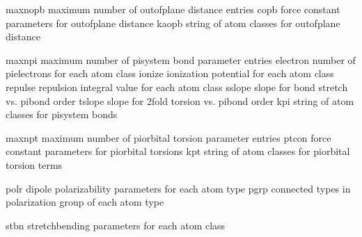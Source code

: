 \documentclass[letterpaper,11pt,english]{sphinxmanual}
\begin{document}
\begin{sphinxVerbatim}[commandchars=\\\{\}]
maxnopb         maximum number of out\PYGZhy{}of\PYGZhy{}plane distance entries
copb            force constant parameters for out\PYGZhy{}of\PYGZhy{}plane distance
kaopb           string of atom classes for out\PYGZhy{}of\PYGZhy{}plane distance
\end{sphinxVerbatim}


\begin{sphinxVerbatim}[commandchars=\\\{\}]
maxnpi          maximum number of pisystem bond parameter entries
electron        number of pi\PYGZhy{}electrons for each atom class
ionize          ionization potential for each atom class
repulse         repulsion integral value for each atom class
sslope          slope for bond stretch vs. pi\PYGZhy{}bond order
tslope          slope for 2\PYGZhy{}fold torsion vs. pi\PYGZhy{}bond order
kpi             string of atom classes for pisystem bonds
\end{sphinxVerbatim}


\begin{sphinxVerbatim}[commandchars=\\\{\}]
maxnpt          maximum number of pi\PYGZhy{}orbital torsion parameter entries
ptcon           force constant parameters for pi\PYGZhy{}orbital torsions
kpt             string of atom classes for pi\PYGZhy{}orbital torsion terms
\end{sphinxVerbatim}


\begin{sphinxVerbatim}[commandchars=\\\{\}]
polr            dipole polarizability parameters for each atom type
pgrp            connected types in polarization group of each atom type
\end{sphinxVerbatim}


\begin{sphinxVerbatim}[commandchars=\\\{\}]
stbn            stretch\PYGZhy{}bending parameters for each atom class
\end{sphinxVerbatim}
\end{document}
